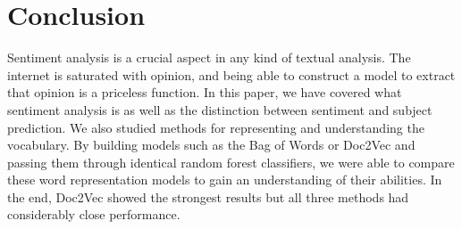 \documentclass[journal]{IEEEtran}
\begin{document}

\section{Conclusion}
Sentiment analysis is a crucial aspect in any kind of textual analysis. The internet is saturated with opinion, and being able to construct a model to extract that opinion is a priceless function. In this paper, we have covered what sentiment analysis is as well as the distinction between sentiment and subject prediction. We also studied methods for representing and understanding the vocabulary. By building models such as the Bag of Words or Doc2Vec and passing them through identical random forest classifiers, we were able to compare these word representation models to gain an understanding of their abilities. In the end, Doc2Vec showed the strongest results but all three methods had considerably close performance. 



%
\end{document}
